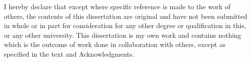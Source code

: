 
\begin{declaration}

I hereby declare that except where specific reference is made to the work of others, the contents of this dissertation are original and have not been submitted in whole or in part for consideration for any other degree or qualification in this, or any other university. This dissertation is my own work and contains nothing which is the outcome of work done in collaboration with others, except as specified in the text and Acknowledgments. %


\end{declaration}

